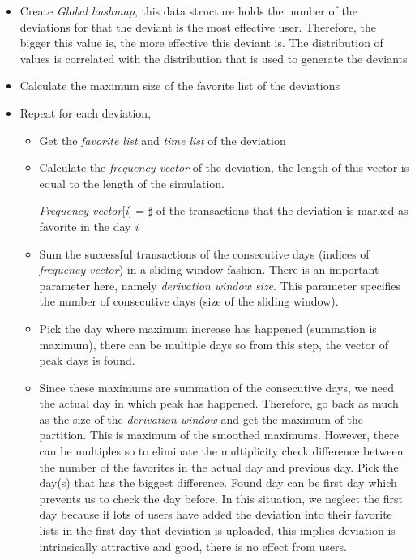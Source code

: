 \documentclass[12pt,a4paper]{report}
\begin{document}
	\begin{itemize}

	\item Create \emph{Global hashmap}, this data structure holds the number of the deviations for that the deviant is the most effective user. Therefore, the bigger this value is, the more effective this deviant is. The distribution of values is correlated with the distribution that is used to generate the deviants

	\item Calculate the maximum size of the favorite list of the deviations

	\item Repeat for each deviation,

		\begin{itemize}

		\item Get the \emph{favorite list} and \emph{time list} of the deviation

		\item Calculate the \emph{frequency vector} of the deviation, the length of this vector is equal to the length of the simulation.
	
 			\emph{Frequency vector}[\emph{i}] = $\sharp$ of the transactions that the deviation is marked as favorite in the day \emph{i}

		\item Sum the successful transactions of the consecutive days (indices of \emph{frequency vector}) in a sliding window fashion. There is an important parameter here, namely \emph{derivation window size}. This parameter specifies the number of consecutive days (size of the sliding window).

		\item Pick the day where maximum increase has happened (summation is maximum), there can be multiple days so from this step, the vector of peak days is found.

		\item Since these maximums are summation of the consecutive days, we need the actual day in which peak has happened. Therefore, go back as much as the size of the \emph{derivation window} and get the maximum of the partition. This is maximum of the smoothed maximums. However,  there can be multiples so to eliminate the multiplicity check difference between the number of the favorites in the actual day and previous day. Pick the day(s) that has the biggest difference. Found day can be first day which prevents us to check the day before. In this situation, we neglect the first day because if lots of users have added the deviation into their favorite lists in the first day that deviation is uploaded, this implies deviation is intrinsically attractive and good, there is no effect from users.
		

\end{itemize}
\end{itemize}
\end{document}
